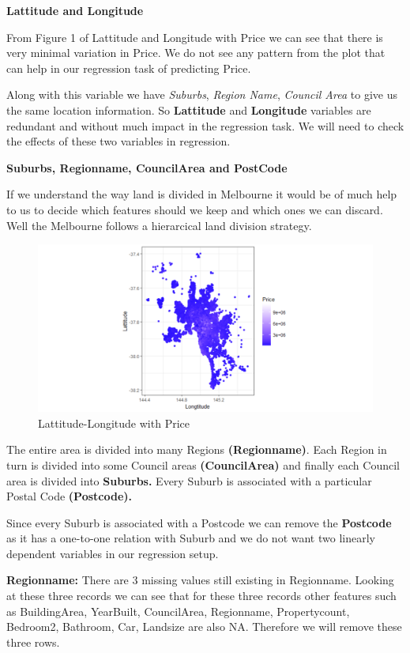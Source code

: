 \documentclass[]{article}
\begin{document}
\textbf{Lattitude and Longitude}

From Figure 1 of Lattitude and Longitude with Price we can see that
there is very minimal variation in Price. We do not see any pattern from
the plot that can help in our regression task of predicting Price.

Along with this variable we have \emph{Suburbs}, \emph{Region Name},
\emph{Council Area} to give us the same location information. So
\textbf{Lattitude} and \textbf{Longitude} variables are redundant and
without much impact in the regression task. We will need to check the
effects of these two variables in regression.

\textbf{Suburbs, Regionname, CouncilArea and PostCode}

If we understand the way land is divided in Melbourne it would be of
much help to us to decide which features should we keep and which ones
we can discard. Well the Melbourne follows a hierarcical land division
strategy.

\begin{figure}
\centering
\includegraphics{Report_files/figure-latex/unnamed-chunk-2-1.pdf}
\caption{Lattitude-Longitude with Price}
\end{figure}

The entire area is divided into many Regions \textbf{(Regionname)}. Each
Region in turn is divided into some Council areas \textbf{(CouncilArea)}
and finally each Council area is divided into \textbf{Suburbs.} Every
Suburb is associated with a particular Postal Code \textbf{(Postcode).}

Since every Suburb is associated with a Postcode we can remove the
\textbf{Postcode} as it has a one-to-one relation with Suburb and we do
not want two linearly dependent variables in our regression setup.

\textbf{Regionname:} There are 3 missing values still existing in
Regionname. Looking at these three records we can see that for these
three records other features such as BuildingArea, YearBuilt,
CouncilArea, Regionname, Propertycount, Bedroom2, Bathroom, Car,
Landsize are also NA. Therefore we will remove these three rows.
\end{document}
